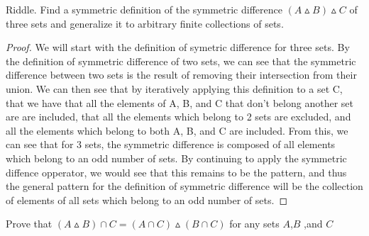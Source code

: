     \begin{minorEx}%
    Riddle. Find a symmetric definition of the symmetric difference $(A \vartriangle B) \vartriangle C$ of three sets and generalize it to arbitrary finite collections of sets.
   	\end{minorEx}
    \begin{proof}
    We will start with the definition of symetric  difference for three sets. By the definition of symmetric difference of two sets, we can see that the symmetric difference between two sets is the result of removing their intersection from their union. We can then see that by iteratively applying this definition to a set C, that we have that all the elements of A, B, and C that don't belong another set are are included, that all the elements which belong to 2 sets are excluded, and all the elements which belong to both A, B, and C are included. From this, we can see that for 3 sets, the symmetric difference is composed of all elements which belong to an odd number of sets. By continuing to apply the symmetric diffence opperator, we would see that this remains to be the pattern, and thus the general pattern for the definition of symmetric difference will be the collection of elements of all sets which belong to an odd number of sets.
    \end{proof}
    \begin{minorEx}[Distributivity]%
    Prove that $(A \vartriangle B) \cap C = (A \cap C) \vartriangle (B \cap C)$ for any sets $A$,$B$ ,and $C$
   	\end{minorEx}
